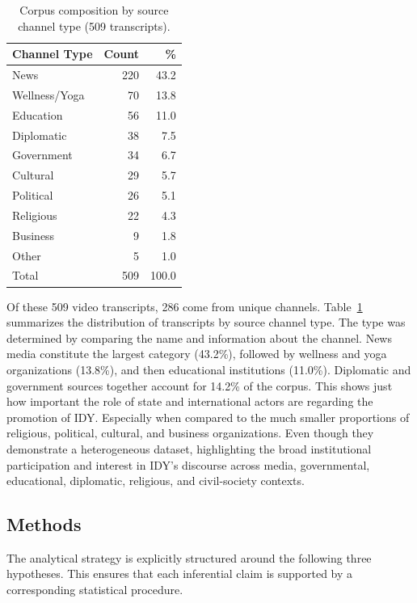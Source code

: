 \documentclass[11pt]{article}
\begin{document}
\begin{table}[htbp]
\centering
\label{tab:channel_types}
\caption{Corpus composition by source channel type (509 transcripts).}
\begin{tabular}{lrr}
\toprule
Channel Type & Count & \% \\
\midrule
News & 220 & 43.2 \\
Wellness/Yoga & 70 & 13.8 \\
Education & 56 & 11.0 \\
Diplomatic & 38 & 7.5 \\
Government & 34 & 6.7 \\
Cultural & 29 & 5.7 \\
Political & 26 & 5.1 \\
Religious & 22 & 4.3 \\
Business & 9 & 1.8 \\
Other & 5 & 1.0 \\
\midrule
Total & 509 & 100.0 \\
\bottomrule
\end{tabular}
\label{tab:corpus_channels}
\end{table}

Of these 509 video transcripts, 286 come from unique channels. Table~\ref{tab:corpus_channels} summarizes the distribution of transcripts by source channel type. The type was determined by comparing the name and information about the channel. News media constitute the largest category (43.2\%), followed by wellness and yoga organizations (13.8\%), and then educational institutions (11.0\%). Diplomatic and government sources together account for 14.2\% of the corpus. This shows just how important the role of state and international actors are regarding the promotion of IDY. Especially when compared to the much smaller proportions of religious, political, cultural, and business organizations. Even though they demonstrate a heterogeneous dataset, highlighting the broad institutional participation and interest in IDY's discourse across media, governmental, educational, diplomatic, religious, and civil-society contexts.

\subsection{Methods}

The analytical strategy is explicitly structured around the following three hypotheses. This ensures that each inferential claim is supported by a corresponding statistical procedure.
\end{document}
